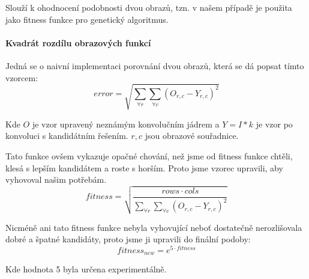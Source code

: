 \documentclass[a4paper,11pt,titlepage]{scrartcl}
\begin{document}
Slouží k ohodnocení podobnosti dvou obrazů, tzn. v našem případě je použita jako fitness funkce pro genetický algoritmus.

\paragraph{Kvadrát rozdílu obrazových funkcí}

Jedná se o naivní implementaci porovnání dvou obrazů, která se dá popsat tímto vzorcem:
\begin{equation}
  error = \sqrt{\sum\limits_{\forall r} \sum\limits_{\forall c} ( O_{r,c} - Y_{r,c} )^2}
\end{equation}

Kde $O$ je vzor upravený neznámým konvolučním jádrem a $Y = I \ast k $ je vzor po konvoluci s kandidátním řešením. $r,c$ jsou obrazové souřadnice.

Tato funkce ovšem vykazuje opačné chování, než jsme od fitness funkce chtěli, klesá s lepším kandidátem a roste s horším. Proto jsme vzorec upravili, aby vyhovoval našim potřebám.
\begin{equation}
  fitness = \sqrt{\frac{rows \cdot cols}{{\sum\limits_{\forall r} \sum\limits_{\forall c} ( O_{r,c} - Y_{r,c} )^2}}}
\end{equation}

Nicméně ani tato fitness funkce nebyla vyhovující neboť dostatečně nerozlišovala dobré a špatné kandidáty, proto jsme ji upravili do finální podoby:
\begin{equation}
  fitness_{new} = e ^ {5 \cdot fitness}
\end{equation}

Kde hodnota 5 byla určena experimentálně.
\end{document}
